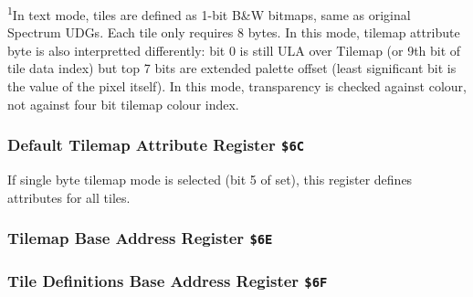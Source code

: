 \documentclass[12pt,twoside,openright,a4paper]{book}
\newcommand{\Deg}{\textsuperscript{o}}
\newcommand{\See}[1]{\textsuperscript{#1}}
\begin{document}
\See{1}In text mode, tiles are defined as 1-bit B\&W bitmaps, same as original Spectrum UDGs. Each tile only requires 8 bytes. In this mode, tilemap attribute byte is also interpretted differently: bit 0 is still ULA over Tilemap (or 9th bit of tile data index) but top 7 bits are extended palette offset (least significant bit is the value of the pixel itself). In this mode, transparency is checked against  colour, not against four bit tilemap colour index.


\subsubsection{Default Tilemap Attribute Register {\tt \$6C}}

If single byte tilemap mode is selected (bit 5 of  set), this register defines attributes for all tiles.

\begin{NextPort}
		\PortDesc{{\tt 1} rotate tiles 90\Deg clockwise}
\end{NextPort}


\subsubsection{Tilemap Base Address Register {\tt \$6E}}

\begin{NextPort}
\end{NextPort}


\subsubsection{Tile Definitions Base Address Register {\tt \$6F}}

\begin{NextPort}
\end{NextPort}
\end{document}
